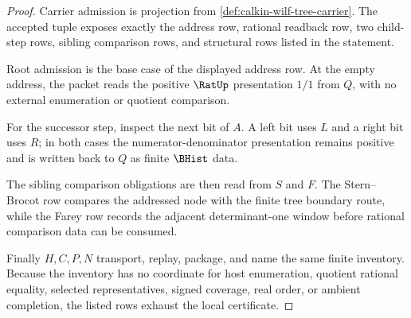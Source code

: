 \begin{proof}
Carrier admission is projection from \autoref{def:calkin-wilf-tree-carrier}. The accepted tuple exposes exactly the address row, rational readback row, two child-step rows, sibling comparison rows, and structural rows listed in the statement.

Root admission is the base case of the displayed address row. At the empty address, the packet reads the positive $\RatUp$ presentation $1/1$ from $Q$, with no external enumeration or quotient comparison.

For the successor step, inspect the next bit of $A$. A left bit uses $L$ and a right bit uses $R$; in both cases the numerator-denominator presentation remains positive and is written back to $Q$ as finite $\BHist$ data.

The sibling comparison obligations are then read from $S$ and $F$. The Stern--Brocot row compares the addressed node with the finite tree boundary route, while the Farey row records the adjacent determinant-one window before rational comparison data can be consumed.

Finally $H,C,P,N$ transport, replay, package, and name the same finite inventory. Because the inventory has no coordinate for host enumeration, quotient rational equality, selected representatives, signed coverage, real order, or ambient completion, the listed rows exhaust the local certificate.
\end{proof}

